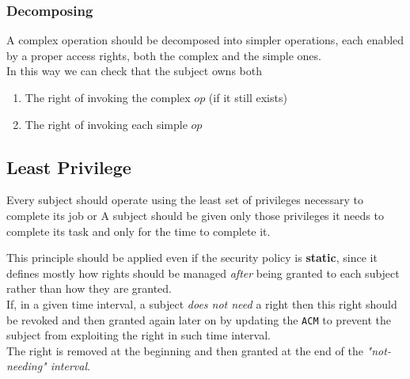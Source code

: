 \subsubsection{Decomposing}
A complex operation should be decomposed into simpler
operations, 
each enabled by a proper access rights,
both the complex and the simple ones.\\
In this way we can check that the subject owns both
\begin{enumerate}
   \item The right of invoking the complex $op$ (if it still exists)
   \item The right of invoking each simple $op$
\end{enumerate}

\subsection{Least Privilege}

Every subject should operate using the least set of privileges
necessary to complete its job
or
A subject should be given only those privileges it needs to complete
its task and only for the time to complete it.


This principle should be applied even if the security policy is
\textbf{static},
since it defines mostly how rights should be managed \textit{after} being
granted to each subject rather than how they are granted.\\
If, in a given time interval, a subject \textit{does not need} a right
then this right should be revoked and then granted again later on by
updating the \texttt{ACM} to prevent the subject from exploiting the right in such time interval.\\
The right is removed at the beginning and then granted at the
end of the \textit{"not-needing" interval}.

